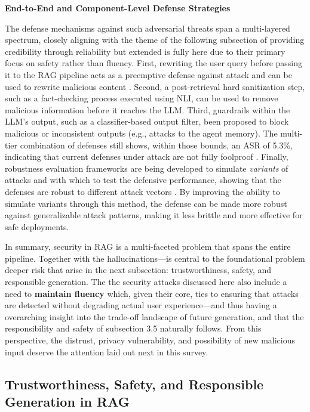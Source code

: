 \documentclass[11pt]{article}
\begin{document}
\textbf{End-to-End and Component-Level Defense Strategies}

The defense mechanisms against such adversarial threats span a multi-layered spectrum, closely aligning with the theme of the following subsection of providing credibility through reliability but extended is fully here due to their primary focus on safety rather than fluency. First, rewriting the user query before passing it to the RAG pipeline acts as a preemptive defense against attack and can be used to rewrite malicious content \cite{ref159}. Second, a post-retrieval hard sanitization step, such as a fact-checking process executed using NLI, can be used to remove malicious information before it reaches the LLM. Third, guardrails within the LLM's output, such as a classifier-based output filter, been proposed to block malicious or inconsistent outputs (e.g., attacks to the agent memory). The multi-tier combination of defenses still shows, within those bounds, an ASR of 5.3\%, indicating that current defenses under attack are not fully foolproof \cite{ref159}. Finally, robustness evaluation frameworks are being developed to simulate \emph{variants} of attacks and with which to test the defensive performance, showing that the defenses are robust to different attack vectors \cite{ref161}. By improving the ability to simulate variants through this method, the defense can be made more robust against generalizable attack patterns, making it less brittle and more effective for safe deployments.

In summary, security in RAG is a multi-faceted problem that spans the entire pipeline. Together with the hallucinations---is central to the foundational problem deeper risk that arise in the next subsection: trustworthiness, safety, and responsible generation. The the security attacks discussed here also include a need to \textbf{maintain fluency} which, given their core, ties to ensuring that attacks are detected without degrading actual user experience---and thus having a overarching insight into the trade-off landscape of future generation, and that the responsibility and safety of subsection 3.5 naturally follows. From this perspective, the distrust, privacy vulnerability, and possibility of new malicious input deserve the attention laid out next in this survey.

\subsection{Trustworthiness, Safety, and Responsible Generation in RAG}
\end{document}
